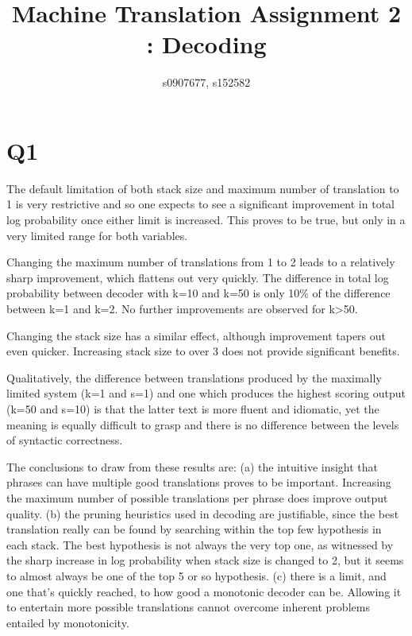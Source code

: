 \documentclass[11pt]{article}
\title{ Machine Translation Assignment 2 : Decoding} %
\author{s0907677, s152582} %
\date{}
\begin{document}
\maketitle %

\section*{Q1}
The default limitation of both stack size and maximum number of translation to 1 is very restrictive and so one expects to see a significant improvement in total log probability once either limit is increased. This proves to be true, but only in a very limited range for both variables.

Changing the maximum number of translations from 1 to 2 leads to a relatively sharp improvement, which flattens out very quickly. The difference in total log probability between decoder with k=10 and k=50 is only 10\% of the difference between k=1 and k=2. No further improvements are observed for k>50.

Changing the stack size has a similar effect, although improvement tapers out even quicker. Increasing stack size to over 3 does not provide significant benefits.

Qualitatively, the difference between translations produced by the maximally limited system (k=1 and s=1) and one which produces the highest scoring output (k=50 and s=10) is that the latter text is more fluent and idiomatic,  yet the meaning is equally difficult to grasp and there is no difference between the levels of syntactic correctness.

The conclusions to draw from these results are:
(a) the intuitive insight that phrases can have multiple good translations proves to be important. Increasing the maximum number of possible translations per phrase does improve output quality.
(b) the pruning heuristics used in decoding are justifiable, since the best translation really can be found by searching within the top few hypothesis in each stack. The best hypothesis is not always the very top one, as witnessed by the sharp increase in log probability when stack size is changed to 2, but it seems to almost always be one of the top 5 or so hypothesis.
(c) there is a limit, and one that's quickly reached, to how good a monotonic decoder can be. Allowing it to entertain more possible translations cannot overcome inherent problems entailed by monotonicity.
\end{document}
